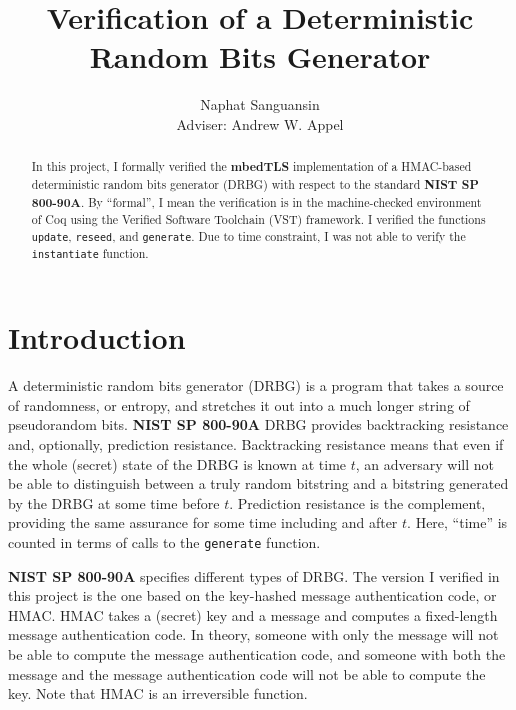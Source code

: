 \documentclass[pageno]{jpaper}
\newcommand{\stdtitle}[1]{\textbf{#1}}
\begin{document}
\title{
Verification of a Deterministic Random Bits Generator
}

\author{Naphat Sanguansin\\Adviser: Andrew W. Appel}

\date{}
\maketitle

\thispagestyle{empty}
\doublespacing
\begin{abstract}
In this project, I formally verified the \stdtitle{mbedTLS} implementation of a HMAC-based deterministic random bits generator (DRBG) with respect to the standard \stdtitle{NIST SP 800-90A}. By “formal”, I mean the verification is in the machine-checked environment of Coq using the Verified Software Toolchain (VST) framework. I verified the functions \lstinline{update}, \lstinline{reseed}, and \lstinline{generate}. Due to time constraint, I was not able to verify the \lstinline{instantiate} function.
\end{abstract}

\section{Introduction}
A deterministic random bits generator (DRBG) is a program that takes a source of randomness, or entropy, and stretches it out into a much longer string of pseudorandom bits. \stdtitle{NIST SP 800-90A} \cite{nist} DRBG provides backtracking resistance and, optionally, prediction resistance. Backtracking resistance means that even if the whole (secret) state of the DRBG is known at time $t$, an adversary will not be able to distinguish between a truly random bitstring and a bitstring generated by the DRBG at some time before $t$. Prediction resistance is the complement, providing the same assurance for some time including and after $t$. Here, “time” is counted in terms of calls to the \lstinline{generate} function.

\stdtitle{NIST SP 800-90A} specifies different types of DRBG. The version I verified in this project is the one based on the key-hashed message authentication code, or HMAC. HMAC takes a (secret) key and a message and computes a fixed-length message authentication code. In theory, someone with only the message will not be able to compute the message authentication code, and someone with both the message and the message authentication code will not be able to compute the key. Note that HMAC is an irreversible function.
\end{document}
